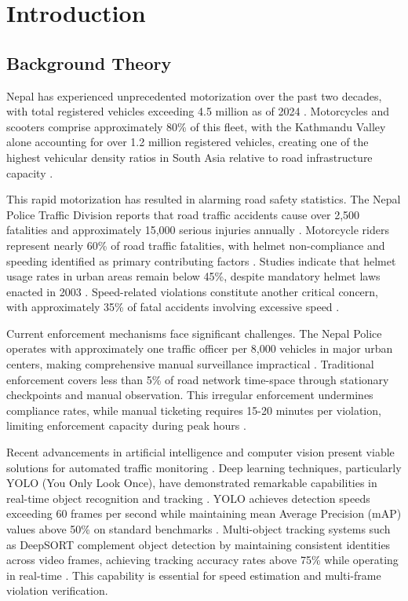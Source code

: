 \documentclass[12pt, a4paper, oneside]{memoir}
\begin{document}
\mainmatter

\chapter{Introduction}

\section{Background Theory}

Nepal has experienced unprecedented motorization over the past two decades, with total registered vehicles exceeding 4.5 million as of 2024 \cite{asiantransport2025}. Motorcycles and scooters comprise approximately 80\% of this fleet, with the Kathmandu Valley alone accounting for over 1.2 million registered vehicles, creating one of the highest vehicular density ratios in South Asia relative to road infrastructure capacity \cite{acharya2015}.

This rapid motorization has resulted in alarming road safety statistics. The Nepal Police Traffic Division reports that road traffic accidents cause over 2,500 fatalities and approximately 15,000 serious injuries annually \cite{who2023}. Motorcycle riders represent nearly 60\% of road traffic fatalities, with helmet non-compliance and speeding identified as primary contributing factors \cite{nepalpolice2025}. Studies indicate that helmet usage rates in urban areas remain below 45\%, despite mandatory helmet laws enacted in 2003 \cite{who2023}. Speed-related violations constitute another critical concern, with approximately 35\% of fatal accidents involving excessive speed \cite{asiantransport2025}.

Current enforcement mechanisms face significant challenges. The Nepal Police operates with approximately one traffic officer per 8,000 vehicles in major urban centers, making comprehensive manual surveillance impractical \cite{nepalpolice2025}. Traditional enforcement covers less than 5\% of road network time-space through stationary checkpoints and manual observation. This irregular enforcement undermines compliance rates, while manual ticketing requires 15-20 minutes per violation, limiting enforcement capacity during peak hours \cite{acharya2015}.

Recent advancements in artificial intelligence and computer vision present viable solutions for automated traffic monitoring \cite{sushma2025traffic}. Deep learning techniques, particularly YOLO (You Only Look Once), have demonstrated remarkable capabilities in real-time object recognition and tracking \cite{ultralytics2025yolo}. YOLO achieves detection speeds exceeding 60 frames per second while maintaining mean Average Precision (mAP) values above 50\% on standard benchmarks \cite{jetir2023}. Multi-object tracking systems such as DeepSORT complement object detection by maintaining consistent identities across video frames, achieving tracking accuracy rates above 75\% while operating in real-time \cite{ijarcce2026}. This capability is essential for speed estimation and multi-frame violation verification.
\end{document}
